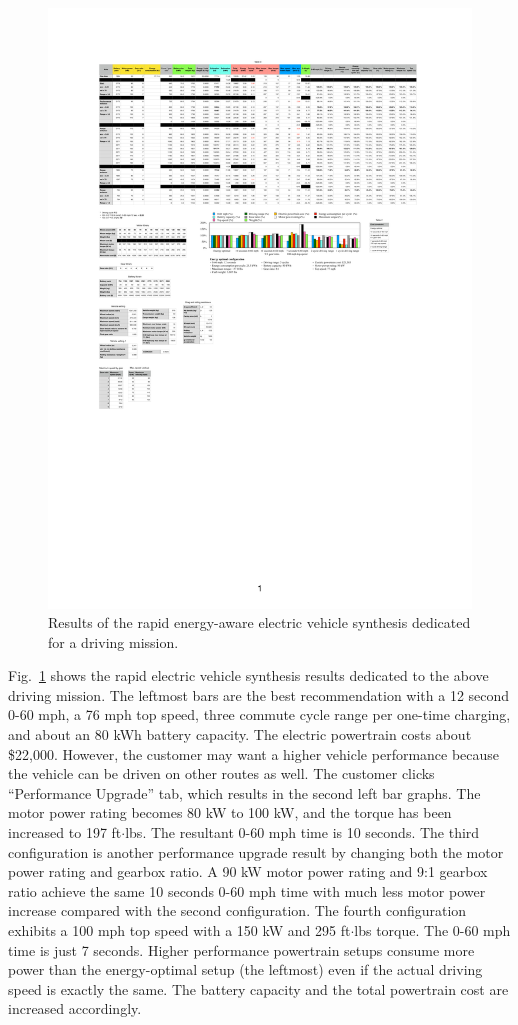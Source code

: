 \documentclass[journal]{IEEEtran}
\begin{document}
\begin{figure}
\centering
\includegraphics[width=0.9\hsize]{Figures/synthesis_results.pdf}
\caption{Results of the rapid energy-aware electric vehicle synthesis dedicated for a driving mission.}
\label{fig:synthesis_results}
\end{figure}    

Fig.~\ref{fig:synthesis_results} shows the rapid electric vehicle synthesis results dedicated to the above driving mission. The leftmost bars are the best recommendation with a 12 second 0-60 mph, a 76 mph top speed, three commute cycle range per one-time charging, and about an 80 kWh battery capacity. The electric powertrain costs about \$22,000. However, the customer may want a higher vehicle performance because the vehicle can be driven on other routes as well. The customer clicks ``Performance Upgrade'' tab, which results in the second left bar graphs. The motor power rating becomes 80 kW to 100 kW, and the torque has been increased to 197 ft$\cdot$lbs. The resultant 0-60 mph time is 10 seconds. 
The third configuration is another performance upgrade result by changing both the motor power rating and gearbox ratio. A 90 kW motor power rating and 9:1 gearbox ratio achieve the same 10 seconds 0-60 mph time with much less motor power increase compared with the second configuration.  
The fourth configuration exhibits a 100 mph top speed with a 150 kW and 295 ft$\cdot$lbs torque. The 0-60 mph time is just 7 seconds. Higher performance powertrain setups consume more power than the energy-optimal setup (the leftmost) even if the actual driving speed is exactly the same. The battery capacity and the total powertrain cost are increased accordingly.
\end{document}
